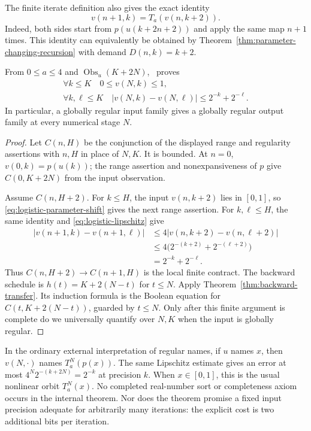 The finite iterate definition also gives the exact identity
\begin{equation}\label{eq:logistic-parameter-shift}
                     v(n+1,k)=T_a(v(n,k+2)).
\end{equation}
Indeed, both sides start from $p(u(k+2n+2))$ and apply the same map
$n+1$ times.  This identity can equivalently be obtained by
Theorem~\ref{thm:parameter-changing-recursion} with demand $D(n,k)=k+2$.

\begin{theorem}
\label{thm:nonlinear-name-validity}
From $0\le a\le4$ and $\operatorname{Obs}_u(K+2N)$, \ipra\ proves
\[
 \begin{gathered}
      \forall k\le K\quad 0\le v(N,k)\le1,\\
      \forall k,\ell\le K\quad
       |v(N,k)-v(N,\ell)|\le2^{-k}+2^{-\ell}.
 \end{gathered}
\]
In particular, a globally regular input family gives a globally regular
output family at every numerical stage $N$.
\end{theorem}

\begin{proof}
Let $C(n,H)$ be the conjunction of the displayed range and regularity
assertions with $n,H$ in place of $N,K$.  It is bounded.  At $n=0$,
$v(0,k)=p(u(k))$; the range assertion and nonexpansiveness of $p$ give
$C(0,K+2N)$ from the input observation.

Assume $C(n,H+2)$.  For $k\le H$, the input $v(n,k+2)$ lies in $[0,1]$,
so \eqref{eq:logistic-parameter-shift} gives the next range assertion.
For $k,\ell\le H$, the same identity and
\eqref{eq:logistic-lipschitz} give
\[
 \begin{split}
 |v(n+1,k)-v(n+1,\ell)|
 &\le4|v(n,k+2)-v(n,\ell+2)|\\
 &\le4\bigl(2^{-(k+2)}+2^{-(\ell+2)}\bigr)\\
 &=2^{-k}+2^{-\ell}.
 \end{split}
\]
Thus $C(n,H+2)\to C(n+1,H)$ is the local finite contract.
The backward schedule is $h(t)=K+2(N-t)$ for $t\le N$.
Apply Theorem~\ref{thm:backward-transfer}.  Its induction formula is the
Boolean equation for $C(t,K+2(N-t))$, guarded by $t\le N$.
Only after this finite argument is complete do we universally quantify
over $N,K$ when the input is globally regular.
\end{proof}

In the ordinary external interpretation of regular names, if $u$ names
$x$, then $v(N,\cdot)$ names $T_a^N(p(x))$.  The same Lipschitz estimate
gives an error at most
$4^N2^{-(k+2N)}=2^{-k}$ at precision $k$.  When $x\in[0,1]$, this is
the usual nonlinear orbit $T_a^N(x)$.  No completed real-number sort or
completeness axiom occurs in the internal theorem.  Nor does the theorem
promise a fixed input precision adequate for arbitrarily many iterations:
the explicit cost is two additional bits per iteration.

